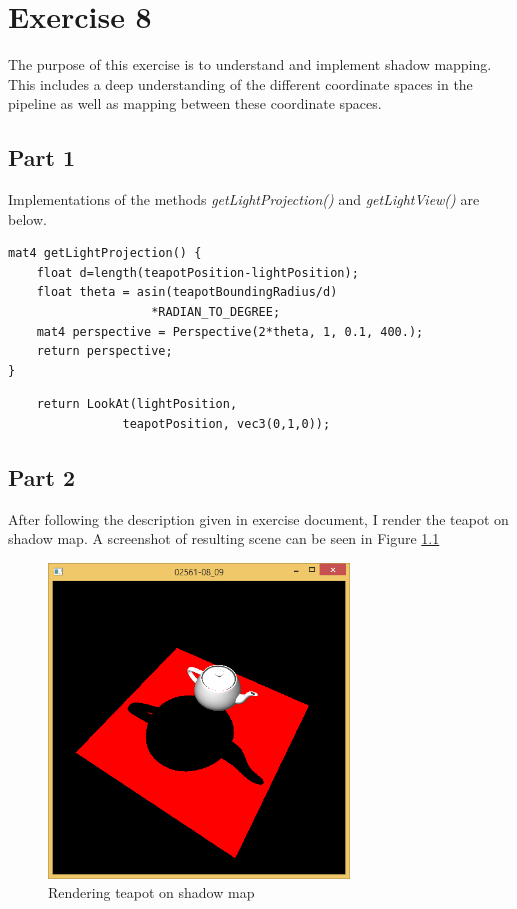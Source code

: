 
\chapter{Exercise 8}
\label{cha:ugeopgave-8}

The purpose of this exercise is to understand and implement shadow mapping. This includes a deep understanding of the different coordinate spaces in the pipeline as well as mapping between these coordinate spaces.

\section{Part 1}

Implementations of the methods \emph{getLightProjection()} and \emph{getLightView()} are below.

\begin{lstlisting}
mat4 getLightProjection() {
	float d=length(teapotPosition-lightPosition);
	float theta = asin(teapotBoundingRadius/d)
                    *RADIAN_TO_DEGREE;
	mat4 perspective = Perspective(2*theta, 1, 0.1, 400.);
	return perspective;
}
\end{lstlisting}
\smallskip
\begin{lstlisting}
	return LookAt(lightPosition, 
                teapotPosition, vec3(0,1,0));

\end{lstlisting}



\section{Part 2}

After following the description given in exercise document, I render the teapot on shadow map. A screenshot of resulting scene can be seen in Figure \ref{fig:8-2}

\begin{figure}[hp]
\centering
\includegraphics[width=8cm]{../Screenshots/ex-8/2.png}
\caption{Rendering teapot on shadow map}
\label{fig:8-2}
\end{figure}

